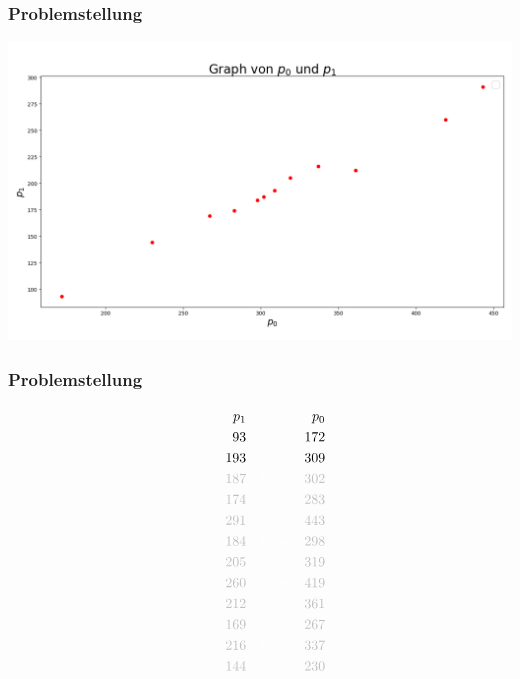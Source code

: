 \documentclass{beamer}
\begin{document}
\begin{frame}
    \centering
    \frametitle{Problemstellung}
    \includegraphics[width=\textwidth]{scatter.png}
\end{frame}

\begin{frame}
    \frametitle{Problemstellung}
    \small
    \begin{alignat*}{5}
           && p_1 &&     && && p_0 \\
        {\color{white}a +}&&                     93 &&   {\color{white}b} &&{\color{white}=}&&                    172 \\
        {\color{white}a +}&&                    193 &&   {\color{white}b} &&{\color{white}=}&&                    309 \\
        {\color{white}a +}&& {\color{lightgray}187} &&   {\color{white}b} &&{\color{white}=}&& {\color{lightgray}302} \\
        {\color{white}a +}&& {\color{lightgray}174} &&   {\color{white}b} &&{\color{white}=}&& {\color{lightgray}283} \\
        {\color{white}a +}&& {\color{lightgray}291} &&   {\color{white}b} &&{\color{white}=}&& {\color{lightgray}443} \\
        {\color{white}a +}&& {\color{lightgray}184} &&   {\color{white}b} &&{\color{white}=}&& {\color{lightgray}298} \\
        {\color{white}a +}&& {\color{lightgray}205} &&   {\color{white}b} &&{\color{white}=}&& {\color{lightgray}319} \\
        {\color{white}a +}&& {\color{lightgray}260} &&   {\color{white}b} &&{\color{white}=}&& {\color{lightgray}419} \\
        {\color{white}a +}&& {\color{lightgray}212} &&   {\color{white}b} &&{\color{white}=}&& {\color{lightgray}361} \\
        {\color{white}a +}&& {\color{lightgray}169} &&   {\color{white}b} &&{\color{white}=}&& {\color{lightgray}267} \\
        {\color{white}a +}&& {\color{lightgray}216} &&   {\color{white}b} &&{\color{white}=}&& {\color{lightgray}337} \\
        {\color{white}a +}&& {\color{lightgray}144} &&   {\color{white}b} &&{\color{white}=}&& {\color{lightgray}230}
    \end{alignat*}
\end{frame}
\end{document}
